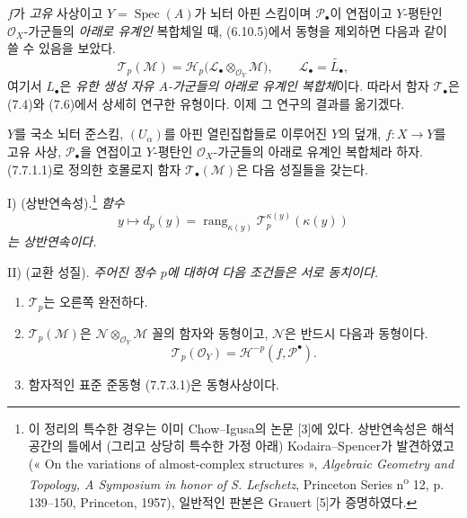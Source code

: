 \begin{env}[7.7.4]
$f$가 \emph{고유} 사상이고 $Y=\operatorname{Spec}(A)$가 뇌터 아핀
스킴이며 $\mathscr P_\bullet$이 연접이고 $Y$-평탄인
$\mathscr O_X$-가군들의 \emph{아래로 유계인} 복합체일 때, (6.10.5)에서
동형을 제외하면 다음과 같이 쓸 수 있음을 보았다.
\[
  \mathscr T_p(\mathscr M)
  =\mathscr H_p
    \bigl(\mathscr L_\bullet\otimes_{\mathscr O_Y}\mathscr M\bigr),
  \qquad
  \mathscr L_\bullet=\widetilde{L_\bullet},
\]
여기서 $L_\bullet$은 \emph{유한 생성 자유 $A$-가군들의 아래로 유계인
복합체}이다. 따라서 함자 $\mathscr T_\bullet$은 (7.4)와 (7.6)에서
상세히 연구한 유형이다. 이제 그 연구의 결과를 옮기겠다.
\end{env}

\begin{theorem}[7.7.5]
$Y$를 국소 뇌터 준스킴, $(U_\alpha)$를 아핀 열린집합들로 이루어진
$Y$의 덮개, $f:X\to Y$를 고유 사상, $\mathscr P_\bullet$을 연접이고
$Y$-평탄인 $\mathscr O_X$-가군들의 아래로 유계인 복합체라 하자.
(7.7.1.1)로 정의한 호몰로지 함자 $\mathscr T_\bullet(\mathscr M)$은
다음 성질들을 갖는다.

\medskip
\noindent
\textnormal{I) (상반연속성).}\footnote{이 정리의 특수한 경우는 이미
Chow--Igusa의 논문 [3]에 있다. 상반연속성은 해석공간의 틀에서 (그리고
상당히 특수한 가정 아래) Kodaira--Spencer가 발견하였고
(« On the variations of almost-complex structures », \emph{Algebraic Geometry
and Topology, A Symposium in honor of S. Lefschetz}, Princeton Series
n\textsuperscript{o} 12, p. 139--150, Princeton, 1957), 일반적인 판본은
Grauert [5]가 증명하였다.}
\emph{함수}
\[
  y\longmapsto
  d_p(y)
  =
  \operatorname{rang}_{\kappa(y)}
    \mathscr T_p^{\kappa(y)}(\kappa(y))
  \tag{7.7.5.1}\label{III.7.7.5.1.fr}
\]
\emph{는 상반연속이다.}

\medskip
\noindent
\textnormal{II) (교환 성질).}
\emph{주어진 정수 $p$에 대하여 다음 조건들은 서로 동치이다.}
\begin{enumerate}
  \item[a)] $\mathscr T_p$는 오른쪽 완전하다.

  \item[a$'$)] $\mathscr T_p(\mathscr M)$은
    $\mathscr N\otimes_{\mathscr O_Y}\mathscr M$ 꼴의 함자와 동형이고,
    $\mathscr N$은 반드시 다음과 동형이다.
    \[
      \mathscr T_p(\mathscr O_Y)
      =
      \mathscr H^{-p}(f,\mathscr P^\bullet).
    \]

  \item[a$''$)] 함자적인 표준 준동형 (7.7.3.1)은 동형사상이다.


\end{enumerate}
\end{theorem}
